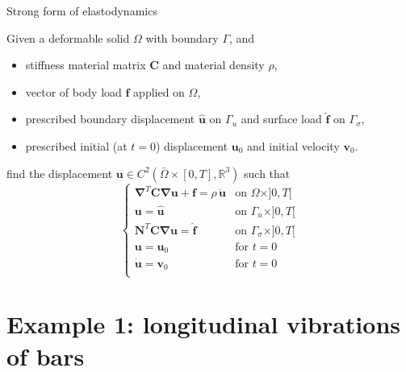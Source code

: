 \documentclass[aspectratio=169]{beamer}
\begin{document}
 {
  \begin{frame}{Strong form of elastodynamics}
    \begin{block}{}
      Given a deformable solid $\Omega$ with boundary $\Gamma$, and
      \begin{itemize}
        \item stiffness material matrix $\mathbf C$ and material density $\rho$,
        \item vector of body load $\mathbf f$ applied on $\Omega$,
        \item prescribed boundary displacement $\mathbf{\hat u}$ on $\Gamma_{u}$ and surface load $\mathbf{\hat f}$ on $\Gamma_{\sigma}$,
        \item prescribed initial (at $t=0$) displacement $\mathbf u_{0}$ and initial velocity $\mathbf v_{0}$.
      \end{itemize}
      find the displacement $\mathbf u\in C^{2}(\bar\Omega\times[0,T],\mathbb R^{3})$ such that
      $$\begin{cases}
          \boldsymbol\nabla^T\mathbf C\boldsymbol\nabla \mathbf u+\mathbf f=\rho\, \mathbf{\ddot{u}} & \text{on }\Omega\times]0,T[         \\
          \mathbf u=\mathbf{\hat u}                                                                  & \text{on } \Gamma_u\times]0,T[      \\
          \mathbf N^T\mathbf  C\boldsymbol\nabla\mathbf  u=\mathbf{\hat f}                           & \text{on } \Gamma_\sigma\times]0,T[ \\
          \mathbf u=\mathbf u_0                                                                      & \text{for } t=0                     \\
          \mathbf{\dot u} =\mathbf v_0                                                               & \text{for } t=0                     \\
        \end{cases}$$
    \end{block}
  \end{frame}
 }

\section{Example 1: longitudinal vibrations of bars}
\end{document}
